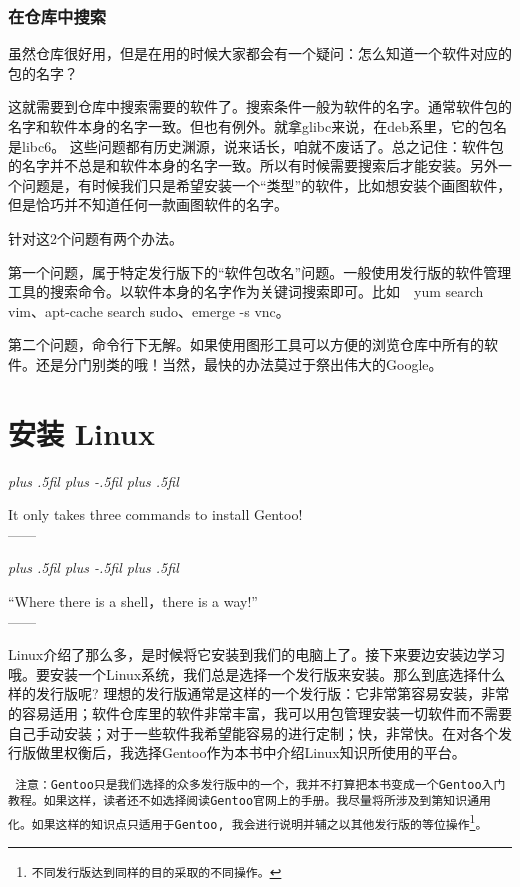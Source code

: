 \documentclass[amstex,twoside]{ctexbook}
\newenvironment{notice}{\tt}{}
\newcommand{\RTLpar}{%
  \leftskip=0pt plus .5fil%
  \rightskip=0pt plus -.5fil%
  \parfillskip=0pt plus .5fil%
}
\newenvironment{quotes}[2][0.55]{\pushQED{#2}%
\begin{flushright}%
\begin{minipage}{#1\textwidth}\begin{flushright}\noindent\it\RTLpar}{%
 \\------\popQED{}\end{flushright}\end{minipage}\end{flushright}\vskip 8mm }%
\begin{document}
\subsection*{在仓库中搜索}

虽然仓库很好用，但是在用的时候大家都会有一个疑问：怎么知道一个软件对应的包的名字？

这就需要到仓库中搜索需要的软件了。搜索条件一般为软件的名字。通常软件包的名字和软件本身的名字一致。但也有例外。就拿glibc来说，在deb系里，它的包名是libc6。
这些问题都有历史渊源，说来话长，咱就不废话了。总之记住：软件包的名字并不总是和软件本身的名字一致。所以有时候需要搜索后才能安装。另外一个问题是，有时候我们只是希望安装一个“类型”的软件，比如想安装个画图软件，但是恰巧并不知道任何一款画图软件的名字。

针对这2个问题有两个办法。

第一个问题，属于特定发行版下的“软件包改名”问题。一般使用发行版的软件管理工具的搜索命令。以软件本身的名字作为关键词搜索即可。比如　yum search vim、apt-cache search sudo、emerge -s vnc。

第二个问题，命令行下无解。如果使用图形工具可以方便的浏览仓库中所有的软件。还是分门别类的哦！当然，最快的办法莫过于祭出伟大的Google。

\chapter{安装 Linux}

\begin{quotes}[0.5]{insomnia}
It only takes three commands to install Gentoo!
\end{quotes}

\begin{quotes}{Anonymous}
“Where there is a shell，there is a way!”
\end{quotes}

Linux介绍了那么多，是时候将它安装到我们的电脑上了。接下来要边安装边学习哦。要安装一个Linux系统，我们总是选择一个发行版来安装。那么到底选择什么样的发行版呢? 理想的发行版通常是这样的一个发行版：它非常第容易安装，非常的容易适用；软件仓库里的软件非常丰富，我可以用包管理安装一切软件而不需要自己手动安装；对于一些软件我希望能容易的进行定制；快，非常快。在对各个发行版做里权衡后，我选择Gentoo作为本书中介绍Linux知识所使用的平台。


\begin{notice}
 注意：Gentoo只是我们选择的众多发行版中的一个，我并不打算把本书变成一个Gentoo入门教程。如果这样，读者还不如选择阅读Gentoo官网上的手册。我尽量将所涉及到第知识通用化。如果这样的知识点只适用于Gentoo, 我会进行说明并辅之以其他发行版的等位操作\footnote{不同发行版达到同样的目的采取的不同操作。}。
\end{notice}
\end{document}
